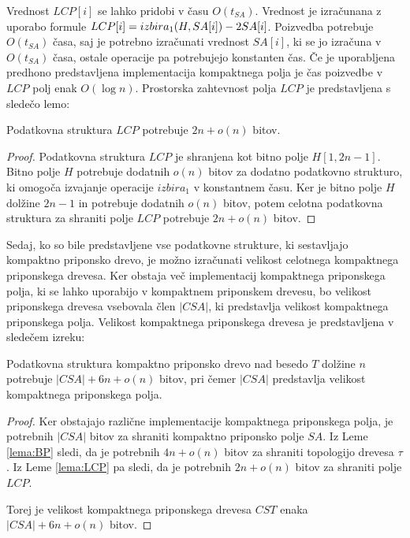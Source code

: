 Vrednost $LCP[i]$ se lahko pridobi v času $O(t_{SA})$. Vrednost je izračunana z uporabo formule $LCP[i]= \mathop{izbira}\nolimits_{1}(H,SA[i])-2SA[i]$. Poizvedba potrebuje $O(t_{SA})$ časa, saj je potrebno izračunati vrednost $SA[i]$, ki se jo izračuna v $O(t_{SA})$ časa, ostale operacije pa potrebujejo konstanten čas. Če je uporabljena predhono predstavljena implementacija kompaktnega polja je čas poizvedbe v $LCP$ polj enak $O(\log{n})$. Prostorska zahtevnost polja $LCP$ je predstavljena s sledečo lemo:

\begin{lema}\label{lema:LCP}
 Podatkovna struktura $LCP$ potrebuje $2n+o(n)$ bitov.
\end{lema}

\begin{proof}
    Podatkovna struktura $LCP$ je shranjena kot bitno polje $H[1,2n-1]$. Bitno polje $H$ potrebuje dodatnih $o(n)$ bitov za dodatno podatkovno strukturo, ki omogoča izvajanje operacije $izbira_1$ v konstantnem času. Ker je bitno polje $H$ dolžine $2n-1$ in potrebuje dodatnih $o(n)$ bitov, potem celotna podatkovna struktura za shraniti polje $LCP$ potrebuje $2n+o(n)$ bitov.
\end{proof}

Sedaj, ko so bile predstavljene vse podatkovne strukture, ki sestavljajo kompaktno priponsko drevo, je možno izračunati velikost celotnega kompaktnega priponskega drevesa. Ker obstaja več implementacij kompaktnega priponskega polja, ki se lahko uporabijo v kompaktnem priponskem drevesu, bo velikost priponskega drevesa vsebovala člen $|CSA|$, ki predstavlja velikost kompaktnega priponskega polja. Velikost kompaktnega priponskega drevesa je predstavljena v sledečem izreku:

\begin{izr}
    Podatkovna struktura kompaktno priponsko drevo nad besedo $T$ dolžine $n$ potrebuje $|CSA|+6n+o(n)$ bitov, pri čemer $|CSA|$ predstavlja velikost kompaktnega priponskega polja.
\end{izr}
\begin{proof}
    Ker obstajajo različne implementacije kompaktnega priponskega polja, je potrebnih $|CSA|$ bitov za shraniti kompaktno priponsko polje $SA$. Iz Leme \ref{lema:BP} sledi, da je potrebnih $4n+o(n)$ bitov za shraniti topologijo drevesa $\tau$. Iz Leme \ref{lema:LCP} pa sledi, da je potrebnih $2n+o(n)$ bitov za shraniti polje $LCP$.

    Torej je velikost kompaktnega priponskega drevesa $CST$ enaka $|CSA|+6n+o(n)$ bitov.
\end{proof}


